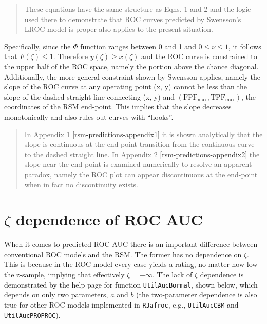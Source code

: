 \documentclass[
]{book}
\begin{document}
\begin{quote}
These equations have the same structure as \citep{swensson1996unified} Eqns. 1 and 2 and the logic used there to demonstrate that ROC curves predicted by Swensson's LROC model is proper also applies to the present situation.
\end{quote}

Specifically, since the \(\Phi\) function ranges between 0 and 1 and \(0 \leq \nu \leq 1\), it follows that \(F\left ( \zeta \right ) \leq 1\). Therefore \(y\left ( \zeta \right ) \geq x\left ( \zeta \right )\) and the ROC curve is constrained to the upper half of the ROC space, namely the portion above the chance diagonal. Additionally, the more general constraint shown by Swensson applies, namely the slope of the ROC curve at any operating point (x, y) cannot be less than the slope of the dashed straight line connecting (x, y) and \(\left (\text{FPF}_{\text{max}}, \text{TPF}_{\text{max}} \right )\), the coordinates of the RSM end-point. This implies that the slope decreases monotonically and also rules out curves with ``hooks''.

\begin{quote}
In Appendix 1 \ref{rsm-predictions-appendix1} it is shown analytically that the slope is continuous at the end-point transition from the continuous curve to the dashed straight line. In Appendix 2 \ref{rsm-predictions-appendix2} the slope near the end-point is examined numerically to resolve an apparent paradox, namely the ROC plot can appear discontinuous at the end-point when in fact no discontinuity exists.
\end{quote}

\hypertarget{rsm-predictions-roc-curve-aucs-zeta1}{%
\section{\texorpdfstring{\(\zeta\) dependence of ROC AUC}{\textbackslash zeta dependence of ROC AUC}}\label{rsm-predictions-roc-curve-aucs-zeta1}}

When it comes to predicted ROC AUC there is an important difference between conventional ROC models and the RSM. The former has no dependence on \(\zeta\). This is because in the ROC model every case yields a rating, no matter how low the z-sample, implying that effectively \(\zeta = -\infty\). The lack of \(\zeta\) dependence is demonstrated by the help page for function \texttt{UtilAucBormal}, shown below, which depends on only two parameters, \(a\) and \(b\) (the two-parameter dependence is also true for other ROC models implemented in \texttt{RJafroc}, e.g., \texttt{UtilAucCBM} and \texttt{UtilAucPROPROC}).
\end{document}
